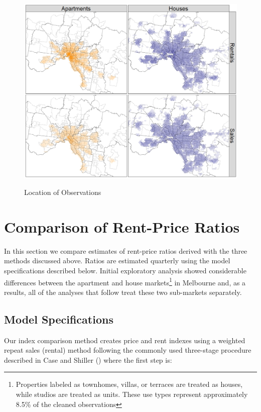 \documentclass{article}\usepackage[]{graphicx}\usepackage[]{color}
\begin{document}
\begin{figure}
\centering
\includegraphics[trim=0 0 0 0, clip, scale=.4]{figure/melbmap.jpg}
\label{map}
\caption{Location of Observations}
\end{figure}

\section*{Comparison of Rent-Price Ratios}

In this section we compare estimates of rent-price ratios derived with the three methods discussed above. Ratios are estimated quarterly using the model specifications described below.  Initial exploratory analysis showed considerable differences between the apartment and house markets\footnote{Properties labeled as townhomes, villas, or terraces are treated as houses, while studios are treated as units.  These use types represent approximately 8.5\% of the cleaned observations} in Melbourne and, as a results, all of the analyses that follow treat these two sub-markets separately.\par

\subsection*{Model Specifications}

Our index comparison method creates price and rent indexes using a weighted repeat sales (rental) method following the commonly used three-stage procedure described in Case and Shiller (\citeyear{Case1987}) where the first step is:
\end{document}
